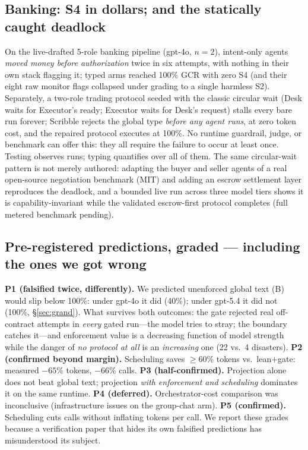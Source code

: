 \documentclass{article}
\begin{document}
\subsection{Banking: S4 in dollars; and the statically caught deadlock}
On the live-drafted 5-role banking pipeline (gpt-4o, $n{=}2$), intent-only agents \emph{moved money before authorization} twice in six attempts, with nothing in their own stack flagging it; typed arms reached 100\% GCR with zero S4 (and their eight raw monitor flags collapsed under grading to a single harmless S2). Separately, a two-role trading protocol seeded with the classic circular wait (Desk waits for Executor's ready; Executor waits for Desk's request) stalls every bare run forever; Scribble rejects the global type \emph{before any agent runs}, at zero token cost, and the repaired protocol executes at 100\%. No runtime guardrail, judge, or benchmark can offer this: they all require the failure to occur at least once. Testing observes runs; typing quantifies over all of them. The same circular-wait pattern is not merely authored: adapting the buyer and seller agents of a real open-source negotiation benchmark \citep{agenticpay} (MIT) and adding an escrow settlement layer reproduces the deadlock, and a bounded live run across three model tiers shows it is capability-invariant while the validated escrow-first protocol completes (full metered benchmark pending).

\subsection{Pre-registered predictions, graded --- including the ones we got wrong}\label{sec:honest}
\textbf{P1 (falsified twice, differently).} We predicted unenforced global text (B) would slip below 100\%: under gpt-4o it did (40\%); under gpt-5.4 it did not (100\%, \S\ref{sec:grand}). What survives both outcomes: the gate rejected real off-contract attempts in \emph{every} gated run---the model tries to stray; the boundary catches it---and enforcement value is a decreasing function of model strength while the danger of \emph{no protocol at all} is an \emph{increasing} one (22 vs.\ 4 disasters). \textbf{P2 (confirmed beyond margin).} Scheduling saves $\geq$60\% tokens vs.\ lean$+$gate: measured $-65\%$ tokens, $-66\%$ calls. \textbf{P3 (half-confirmed).} Projection alone does not beat global text; projection \emph{with enforcement and scheduling} dominates it on the same runtime. \textbf{P4 (deferred).} Orchestrator-cost comparison was inconclusive (infrastructure issues on the group-chat arm). \textbf{P5 (confirmed).} Scheduling cuts calls without inflating tokens per call. We report these grades because a verification paper that hides its own falsified predictions has misunderstood its subject.
\end{document}
